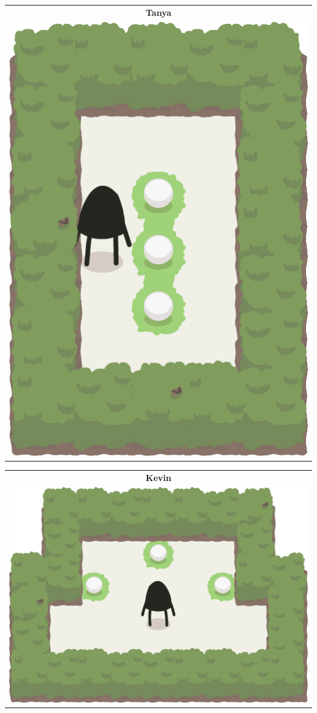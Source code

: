 \documentclass{report}
\theoremstyle{plain}
\begin{document}
\begin{center}
\begin{tabular}{c}
\end{tabular}
\begin{tabular}{c}
\textbf{Tanya} \\
\includegraphics[scale=\levelAnnexWidth]{tanya-1.png}
\end{tabular}
\begin{tabular}{c}
\textbf{Kevin} \\
\includegraphics[scale=\levelAnnexWidth]{kevin-1.png}

\end{tabular}
\end{center}
\end{document}
